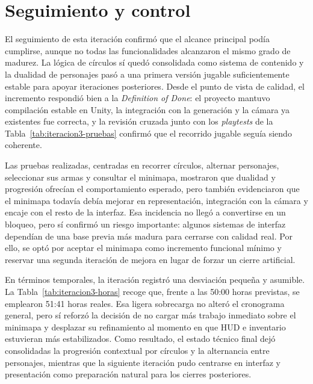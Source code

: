 \section{Seguimiento y control}
El seguimiento de esta iteración confirmó que el alcance principal podía cumplirse, aunque no
todas las funcionalidades alcanzaron el mismo grado de madurez. La lógica de círculos sí quedó
consolidada como sistema de contenido y la dualidad de personajes pasó a una primera versión
jugable suficientemente estable para apoyar iteraciones posteriores. Desde el punto de vista
de calidad, el incremento respondió bien a la \textit{Definition of Done}: el proyecto mantuvo
compilación estable en Unity, la integración con la generación y la cámara ya existentes fue
correcta, y la revisión cruzada junto con los \textit{playtests} de la
Tabla~\ref{tab:iteracion3-pruebas} confirmó que el recorrido jugable seguía siendo coherente.

Las pruebas realizadas, centradas en recorrer círculos, alternar personajes, seleccionar sus
armas y consultar el minimapa, mostraron que dualidad y progresión ofrecían el comportamiento
esperado, pero también evidenciaron que el minimapa todavía debía mejorar en representación,
integración con la cámara y encaje con el resto de la interfaz. Esa incidencia no llegó a
convertirse en un bloqueo, pero sí confirmó un riesgo importante: algunos sistemas de
interfaz dependían de una base previa más madura para cerrarse con calidad real. Por ello,
se optó por aceptar el minimapa como incremento funcional mínimo y reservar una segunda
iteración de mejora en lugar de forzar un cierre artificial.

En términos temporales, la iteración registró una desviación pequeña y asumible. La
Tabla~\ref{tab:iteracion3-horas} recoge que, frente a las 50:00 horas previstas, se emplearon
51:41 horas reales. Esa ligera sobrecarga no alteró el cronograma general, pero sí reforzó la
decisión de no cargar más trabajo inmediato sobre el minimapa y desplazar su refinamiento al
momento en que HUD e inventario estuvieran más estabilizados. Como resultado, el estado
técnico final dejó consolidadas la progresión contextual por círculos y la alternancia entre
personajes, mientras que la siguiente iteración pudo centrarse en interfaz y presentación
como preparación natural para los cierres posteriores.

